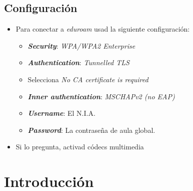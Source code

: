 \documentclass[aspectratio=43]{beamer}
\begin{document}
    \subsection{Configuración}
     \begin{frame}{\subsecname}{}
        \begin{itemize}
            \item Para conectar a \textit{eduroam} usad la siguiente configuración:
            \begin{itemize}
                \item \textbf{\textit{Security}}: \textit{WPA/WPA2 Enterprise}
                \item \textbf{\textit{Authentication}}: \textit{Tunnelled TLS}
                \item Selecciona \textit{No CA certificate is required}
                \item \textbf{\textit{Inner authentication}}: \textit{MSCHAPv2 (no EAP)}
                \item \textbf{\textit{Username}}: El N.I.A.
                \item \textbf{\textit{Password}}: La contraseña de aula global.
            \end{itemize}
            \item Si lo pregunta, activad códecs multimedia
        \end{itemize}
    \end{frame}


    \section{Introducción}
\end{document}
